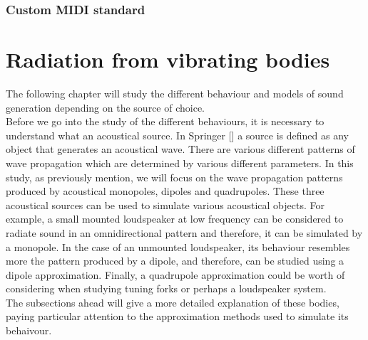\subsection{Custom MIDI standard}\label{custom-midi-standard}


\chapter{Radiation from vibrating bodies}
\label{chapter4}
The following chapter will study the different behaviour and models of sound generation depending on the source of choice.\\
Before we go into the study of the different behaviours, it is necessary to understand what an acoustical source. In Springer [] a source is defined as any object that generates an acoustical wave. There are various different patterns of wave propagation which are determined by various different parameters. In this study, as previously mention, we will focus on the wave propagation patterns produced by acoustical monopoles, dipoles and quadrupoles. These three acoustical sources can be used to simulate various acoustical objects. For example, a small mounted loudspeaker at low frequency can be considered to radiate sound in an omnidirectional pattern and therefore, it can be simulated by a monopole. In the case of an unmounted loudspeaker, its behaviour resembles more the pattern produced by a dipole, and therefore, can be studied using a dipole approximation. Finally, a quadrupole approximation could be worth of considering when studying tuning forks or perhaps a loudspeaker system.\\
The subsections ahead will give a more detailed explanation of these bodies, paying particular attention to the approximation methods used to simulate its behaivour.
